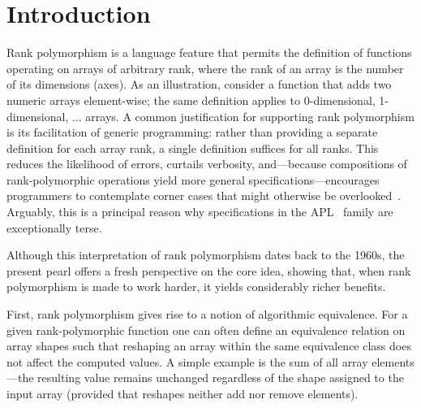 \section{Introduction}

Rank polymorphism is a language feature that permits the definition of
functions operating on arrays of arbitrary rank, where the rank of an array is
the number of its dimensions (axes). As an illustration, consider a
function that adds two numeric arrays element-wise; the same definition applies
to 0-dimensional, 1-dimensional, $\ldots$ arrays. A common justification for
supporting rank polymorphism is its facilitation of generic programming: rather
than providing a separate definition for each array rank, a single definition
suffices for all ranks. This reduces the likelihood of errors, curtails
verbosity, and---because compositions of rank-polymorphic operations yield more
general specifications---encourages programmers to contemplate corner cases that
might otherwise be overlooked~\citep{10.1145/1283920.1283935}. Arguably, this
is a principal reason why specifications in the APL~\citep{Iverson:1962:APL}
family are exceptionally terse.

Although this interpretation of rank polymorphism dates back to the 1960s, the
present pearl offers a fresh perspective on the core idea, showing that,
when rank polymorphism is made to work harder, it yields considerably richer
benefits.

First, rank polymorphism gives rise to a notion of algorithmic
equivalence. For a given rank-polymorphic function one can often define an
equivalence relation on array shapes such that reshaping an array within the
same equivalence class does not affect the computed values. A simple example is
the sum of all array elements---the resulting value remains unchanged regardless
of the shape assigned to the input array (provided that reshapes neither add
nor remove elements).

